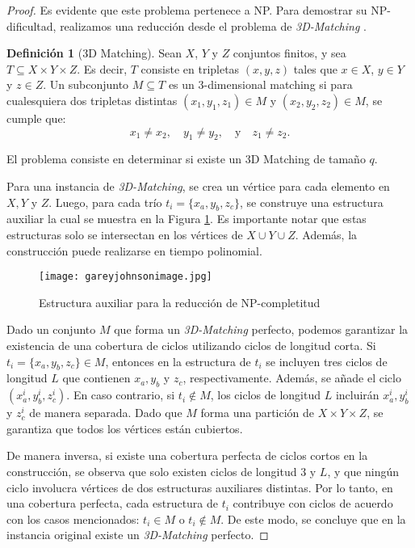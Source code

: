 \documentclass[twocolumn, fontsize=10pt]{article}
\theoremstyle{definition} %
\newtheorem{definition}{Definición} %
\begin{document}
\begin{proof}
Es evidente que este problema pertenece a NP. Para demostrar su NP-dificultad, realizamos una reducción desde el problema de \textit{3D-Matching} \cite{Wikipedia3DMatching}. 


\begin{definition}[3D Matching]
    
    Sean \(X\), \(Y\) y \(Z\) conjuntos finitos, y sea \(T \subseteq X \times Y \times Z\). Es decir, \(T\) consiste en tripletas \((x, y, z)\) tales que \(x \in X\), \(y \in Y\) y \(z \in Z\). Un subconjunto \(M \subseteq T\) es un 3-dimensional matching si para cualesquiera dos tripletas distintas \((x_1, y_1, z_1) \in M\) y \((x_2, y_2, z_2) \in M\), se cumple que:
    \[
    x_1 \neq x_2, \quad y_1 \neq y_2, \quad \text{y} \quad z_1 \neq z_2.
    \]
\end{definition}

El problema consiste en determinar si existe un 3D Matching de tamaño \(q\).


Para una instancia de \textit{3D-Matching}, se crea un vértice para cada elemento en $X, Y$ y $Z$. Luego, para cada trío $t_i = \{x_a, y_b, z_c\}$, se construye una estructura auxiliar la cual se muestra en la Figura \ref{fig:gadget1}. Es importante notar que estas estructuras solo se intersectan en los vértices de $X \cup Y \cup Z$. Además, la construcción puede realizarse en tiempo polinomial.

\begin{figure}[h]
    \centering
    \texttt{[image: gareyjohnsonimage.jpg]}
    \caption{Estructura auxiliar para la reducción de NP-completitud}
    \label{fig:gadget1}
\end{figure}

Dado un conjunto $M$ que forma un \textit{3D-Matching} perfecto, podemos garantizar la existencia de una cobertura de ciclos utilizando ciclos de longitud corta. Si $t_i = \{x_a, y_b, z_c\} \in M$, entonces en la estructura de $t_i$ se incluyen tres ciclos de longitud $L$ que contienen $x_a, y_b$ y $z_c$, respectivamente. Además, se añade el ciclo $(x_a^i, y_b^i, z_c^i)$. En caso contrario, si $t_i \notin M$, los ciclos de longitud $L$ incluirán $x_a^i, y_b^i$ y $z_c^i$ de manera separada. Dado que $M$ forma una partición de $X \times Y \times Z$, se garantiza que todos los vértices están cubiertos.

De manera inversa, si existe una cobertura perfecta de ciclos cortos en la construcción, se observa que solo existen ciclos de longitud $3$ y $L$, y que ningún ciclo involucra vértices de dos estructuras auxiliares distintas. Por lo tanto, en una cobertura perfecta, cada estructura de $t_i$ contribuye con ciclos de acuerdo con los casos mencionados: $t_i \in M$ o $t_i \notin M$. De este modo, se concluye que en la instancia original existe un \textit{3D-Matching} perfecto.
\end{proof}
\end{document}
